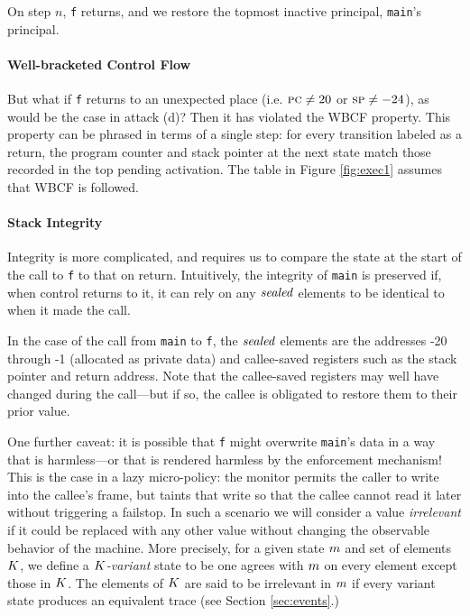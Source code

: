 \documentclass[10pt,conference]{ieeetran}%
\theoremstyle{definition}
\begin{document}
On step \(n\), {\tt f} returns, and we restore the topmost inactive principal,
{\tt main}'s principal. 
         

\paragraph*{Well-bracketed Control Flow}

But what if {\tt f} returns to an unexpected place (i.e. \(\textsc{pc} \neq 20\) or \(\textsc{sp} \neq -24\)),
as would be the case in attack (d)? Then it has violated the WBCF property.
This property can be phrased in terms of a single step: for every transition
labeled as a return, the program counter and stack pointer at the next state
match those recorded in the top pending activation. The table in Figure \ref{fig:exec1}
assumes that WBCF is followed.

\paragraph*{Stack Integrity}

Integrity is more complicated, and requires us to compare the state at the start of
the call to {\tt f} to that on return. Intuitively, the integrity of {\tt main}
is preserved if, when control returns to it, it can rely on any \(\mathit{sealed}\) elements
to be identical to when it made the call.

In the case of the call from {\tt main} to {\tt f}, the \(\mathit{sealed}\) elements are the
addresses -20 through -1 (allocated as private data) and callee-saved registers such as
the stack pointer and return address.
Note that the callee-saved registers may well have changed during the call---but if
so, the callee is obligated to restore them to their prior value.

One further caveat: it is possible that {\tt f} might overwrite {\tt main}'s data
in a way that is harmless---or that is rendered harmless by the enforcement mechanism!
This is the case in a lazy micro-policy: the monitor permits the caller to write into the
callee's frame, but taints that write so that the callee cannot read it later without
triggering a failstop. In such a scenario we will consider a value {\it irrelevant}
if it could be replaced with any other value without changing the observable behavior
of the machine. More precisely, for a given state \(m\) and set of elements \(K\),
we define a {\em \(K\)-variant} state to be one agrees with \(m\) on every
element except those in \(K\). The elements of \(K\) are said to be
irrelevant in \(m\) if every variant state produces an equivalent trace
(see Section \ref{sec:events}.)
\end{document}
